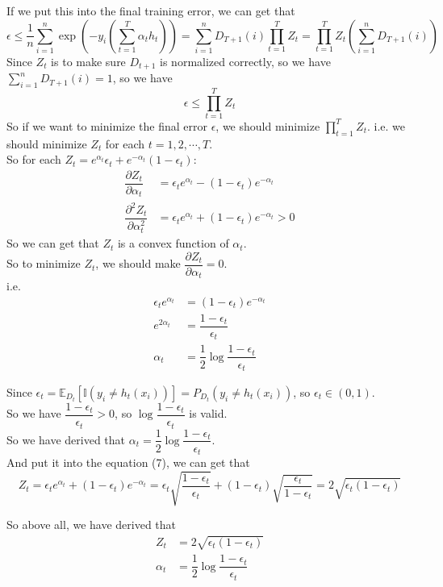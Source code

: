 If we put this into the final training error, we can get that
$$\epsilon \leq \frac{1}{n} \sum_{i=1}^n \exp \left(-y_i \left(\sum_{t=1}^{T}\alpha_th_t\right)\right) = \sum_{i=1}^n D_{T+1}(i)\prod_{t=1}^{T}Z_t = \prod_{t=1}^{T}Z_t\left(\sum_{i=1}^n D_{T+1}(i)\right)$$
Since $Z_t$ is to make sure $D_{t+1}$ is normalized correctly, so we have $\sum\limits_{i=1}^n D_{T+1}(i)=1$, so we have
$$\epsilon \leq \prod_{t=1}^{T}Z_t$$
So if we want to minimize the final error $\epsilon$, we should minimize $\prod\limits_{t=1}^{T}Z_t$. i.e. we should minimize $Z_t$ for each $t=1,2,\cdots,T$. \\
So for each $Z_t=e^{\alpha_t}\epsilon_t+e^{-\alpha_t}(1-\epsilon_t)$:
\begin{align*}
\dfrac{\partial Z_t}{\partial\alpha_t} &= \epsilon_te^{\alpha_t}-(1-\epsilon_t)e^{-\alpha_t} \\
\dfrac{\partial^2 Z_t}{\partial\alpha_t^2} &= \epsilon_te^{\alpha_t}+(1-\epsilon_t)e^{-\alpha_t}>0
\end{align*}
So we can get that $Z_t$ is a convex function of $\alpha_t$. \\
So to minimize $Z_t$, we should make $\dfrac{\partial Z_t}{\partial\alpha_t}=0$. \\
i.e.
\begin{align*}
\epsilon_te^{\alpha_t} &= (1-\epsilon_t)e^{-\alpha_t}\\
e^{2\alpha_t} &= \dfrac{1-\epsilon_t}{\epsilon_t}\\
\alpha_t &= \dfrac{1}{2}\log\dfrac{1-\epsilon_t}{\epsilon_t}
\end{align*}

Since $\epsilon_t=\mathbb{E}_{D_t}[\mathbb{I}(y_{i} \neq h_{t}(x_{i}))]=P_{D_t}(y_{i} \neq h_{t}(x_{i}))$, so $\epsilon_t\in(0,1)$. \\
So we have $\dfrac{1-\epsilon_t}{\epsilon_t}>0$, so $\log\dfrac{1-\epsilon_t}{\epsilon_t}$ is valid. \\
So we have derived that $\alpha_t=\dfrac{1}{2}\log\dfrac{1-\epsilon_t}{\epsilon_t}$. \\
And put it into the equation (7), we can get that
$$Z_t=\epsilon_te^{\alpha_t}+(1-\epsilon_t)e^{-\alpha_t}=\epsilon_t\sqrt{\dfrac{1-\epsilon_t}{\epsilon_t}}+(1-\epsilon_t)\sqrt{\dfrac{\epsilon_t}{1-\epsilon_t}}=2\sqrt{\epsilon_t(1-\epsilon_t)}$$

So above all, we have derived that
\begin{align*}
Z_t &= 2\sqrt{\epsilon_t(1-\epsilon_t)} \\
\alpha_t &= \dfrac{1}{2}\log\dfrac{1-\epsilon_t}{\epsilon_t}
\end{align*}

